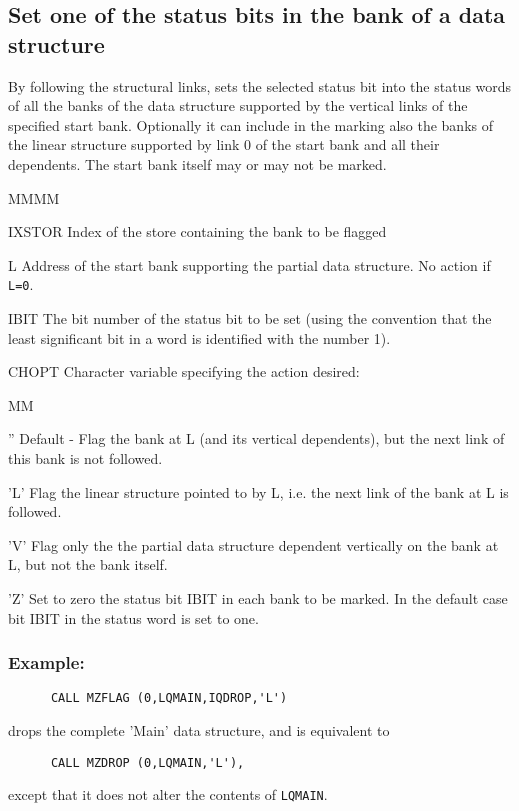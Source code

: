 \subsection{Set one of the status bits in the bank of a data structure}
\par By following the structural links,
 sets the selected status bit into the status words
of all the banks of the data structure supported
by the vertical links of the specified start bank.
Optionally it can include in the marking
also the banks of the linear structure supported
by link 0 of the start bank and all their dependents.
The start bank itself may or may not be marked.
\Idesc
\begin{DL}{MMMM}
\item[IXSTOR]Index of the store containing the bank to be flagged
\item[L]Address of the start bank supporting the partial
data structure.
No action if {\tt L=0}.
\item[IBIT]The bit number of the status bit to be set (using the convention that
the least significant bit in a word is identified with the number 1).
\item[CHOPT]Character variable specifying the action desired:
\begin{DL}{MM}
\item['']Default - Flag the bank at L (and its vertical dependents),
but the next link of this bank is not followed.
\item['L']Flag the linear structure pointed to by L,
i.e. the next link of the bank at L is followed.
\item['V']Flag only the the partial data structure dependent vertically
on the bank at L, but not the bank itself.
\item['Z']Set to zero the status bit IBIT in each bank to be marked.
In the default case bit IBIT in the status word is set to one.
\end{DL}
\end{DL}
\subsubsection{Example:}
\begin{verbatim}
      CALL MZFLAG (0,LQMAIN,IQDROP,'L')
\end{verbatim}
drops the complete 'Main' data structure, and is equivalent to
\begin{verbatim}
      CALL MZDROP (0,LQMAIN,'L'),
\end{verbatim}
except that it does not alter the contents of {\tt LQMAIN}.
